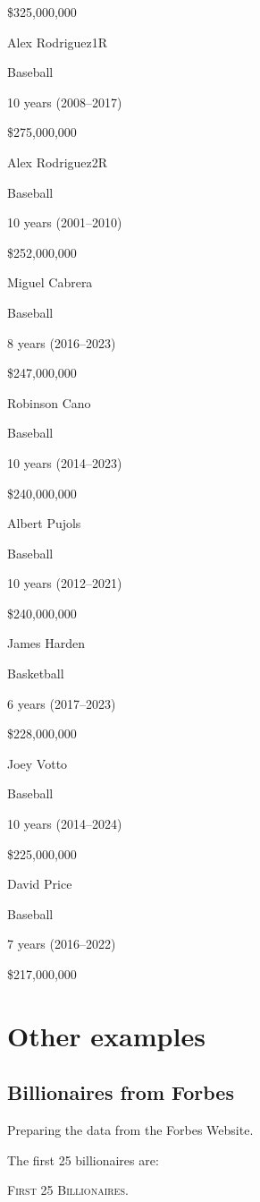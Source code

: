 \documentclass[]{book}
\theoremstyle{definition}
\theoremstyle{definition}
\theoremstyle{definition}
\theoremstyle{remark}
\begin{document}
\$325,000,000

Alex Rodriguez1R

Baseball

10 years (2008--2017)

\$275,000,000

Alex Rodriguez2R

Baseball

10 years (2001--2010)

\$252,000,000

Miguel Cabrera

Baseball

8 years (2016--2023)

\$247,000,000

Robinson Cano

Baseball

10 years (2014--2023)

\$240,000,000

Albert Pujols

Baseball

10 years (2012--2021)

\$240,000,000

James Harden

Basketball

6 years (2017--2023)

\$228,000,000

Joey Votto

Baseball

10 years (2014--2024)

\$225,000,000

David Price

Baseball

7 years (2016--2022)

\$217,000,000

\section{Other examples}\label{other-examples}

\subsection{Billionaires from Forbes}\label{billionaires-from-forbes}

Preparing the data from the Forbes Website.



The first 25 billionaires are:

\label{tab:unnamed-chunk-15}\textsc{First 25 Billionaires.}
\end{document}
